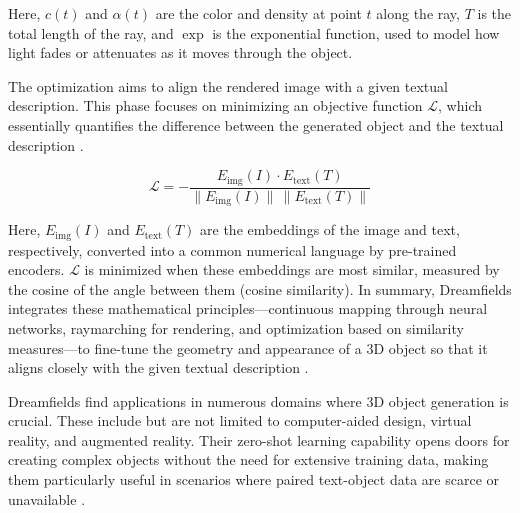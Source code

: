 Here, \( c(t) \) and \( \alpha(t) \) are the color and density at point \( t \) along the ray, \( T \) is the total length of the ray, and \( \exp \) is the exponential function, used to model how light fades or attenuates as it moves through the object. 

The optimization aims to align the rendered image with a given textual description. This phase focuses on minimizing an objective function \( \mathcal{L} \), which essentially quantifies the difference between the generated object and the textual description \citep{jainDreamFields}.

\[
\mathcal{L} = -\frac{E_{\text{img}}(I) \cdot E_{\text{text}}(T)}{\| E_{\text{img}}(I) \| \, \| E_{\text{text}}(T) \|}
\]

Here, \( E_{\text{img}}(I) \) and \( E_{\text{text}}(T) \) are the embeddings of the image and text, respectively, converted into a common numerical language by pre-trained encoders. \( \mathcal{L} \) is minimized when these embeddings are most similar, measured by the cosine of the angle between them (cosine similarity). In summary, Dreamfields integrates these mathematical principles—continuous mapping through neural networks, raymarching for rendering, and optimization based on similarity measures—to fine-tune the geometry and appearance of a 3D object so that it aligns closely with the given textual description \citep{jainDreamFields}.

Dreamfields find applications in numerous domains where 3D object generation is crucial. These include but are not limited to computer-aided design, virtual reality, and augmented reality. Their zero-shot learning capability opens doors for creating complex objects without the need for extensive training data, making them particularly useful in scenarios where paired text-object data are scarce or unavailable \citep{jainDreamFields}.

